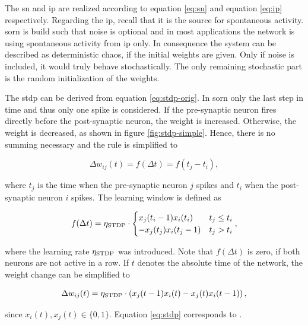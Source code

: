 The \acl{sn} and \acl{ip} are realized according to equation \eqref{eq:sn} and equation \eqref{eq:ip} respectively. Regarding the \acs{ip}, recall that it is the source for spontaneous activity. \acs{sorn} is build such that noise is optional and in most applications the network is using spontaneous activity from \acs{ip} only. In consequence the system can be described as deterministic chaos, if the initial weights are given. Only if noise is included, it would truly behave stochastically. The only remaining stochastic part is the random initialization of the weights.

The \acl{stdp} can be derived from equation \eqref{eq:stdp-orig}. In \acs{sorn} only the last step in time and thus only one spike is considered. If the pre-synaptic neuron fires directly before the post-synaptic neuron, the weight is increased. Otherwise, the weight is decreased, as shown in figure \ref{fig:stdp-simple}. Hence, there is no summing necessary and the rule is simplified to

\begin{equation}
\Delta w_{ij}(t) = f(\Delta t) = f(t_j - t_i),
\end{equation}

where $t_j$ is the time when the pre-synaptic neuron $j$ spikes and $t_i$ when the post-synaptic neuron $i$ spikes. The learning window is defined as

\begin{equation}
f(\Delta t)
= \eta_{\text{STDP}} \cdot \begin{cases} x_j(t_i - 1) x_i(t_i) & t_j \le t_i\\ -x_j(t_j) x_i(t_j - 1) & t_j > t_i \end{cases},
\end{equation}


where the learning rate $\eta_{\text{STDP}}$ was introduced. Note that $f(\Delta t)$ is zero, if both neurons are not active in a row. If $t$ denotes the absolute time of the network, the weight change can be simplified to

\begin{equation}
\label{eq:stdp}
\Delta w_{ij}(t) = \eta_{\text{STDP}} \cdot \left( x_j(t-1) x_i(t) - x_j(t) x_i(t-1) \right),
\end{equation}

since $x_i(t), x_j(t) \in \{0,1\}$. Equation \eqref{eq:stdp} corresponds to \textcite[equation 5]{lazar2009sorn}.

